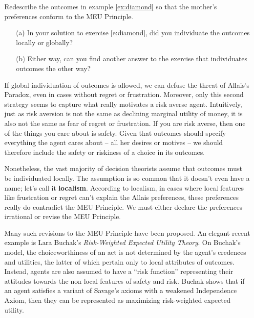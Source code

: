 \begin{exercise1}\label{e:diamond}
  Redescribe the outcomes in example \ref{ex:diamond} so that the
  mother's preferences conform to the MEU Principle.
\end{exercise1}

\begin{exercise2}
  \leavevmode\vspace{-2em}
  \begin{enumerate}
  \itemsep0em 
  \item[(a)] In your solution to exercise \ref{e:diamond}, did you
    individuate the outcomes locally or globally?
  \item[(b)] Either way, can you find another answer to the exercise that
    individuates outcomes the other way?
  \end{enumerate}
  \vspace{-2em}
\end{exercise2}

If global individuation of outcomes is allowed, we can defuse the
threat of Allais's Paradox, even in cases without regret or
frustration. Moreover, only this second strategy seems to capture what
really motivates a risk averse agent. Intuitively, just as risk
aversion is not the same as declining marginal utility of money, it is
also not the same as fear of regret or frustration. If you are risk
averse, then one of the things you care about is safety. Given that
outcomes should specify everything the agent cares about -- all her
desires or motives -- we should therefore include the safety or
riskiness of a choice in its outcomes.

Nonetheless, the vast majority of decision theorists assume that
outcomes must be individuated locally. The assumption is so common
that it doesn't even have a name; let's call it
\textbf{localism}. According to localism, in cases where local
features like frustration or regret can't explain the Allais
preferences, these preferences really do contradict the MEU
Principle. We must either declare the preferences irrational or revise
the MEU Principle.

Many such revisions to the MEU Principle have been proposed. An
elegant recent example is Lara Buchak's \emph{Risk-Weighted
  Expected Utility Theory}. On Buchak's model, the choiceworthiness of an
act is not determined by the agent's credences and utilities, the
latter of which pertain only to local attributes of outcomes. Instead,
agents are also assumed to have a ``risk function'' representing their
attitudes towards the non-local features of safety and risk. Buchak
shows that if an agent satisfies a variant of Savage's axioms with a
weakened Independence Axiom, then they can be represented as
maximizing risk-weighted expected utility.

